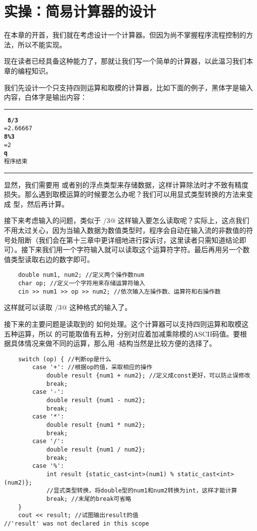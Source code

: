 \section{实操：简易计算器的设计}
在本章的开首，我们就在考虑设计一个计算器。但因为尚不掌握程序流程控制的方法，所以不能实现。\par
现在读者已经具备这种能力了，那就让我们写一个简单的计算器，以此温习我们本章的编程知识。\par
我们先设计一个只支持四则运算和取模的计算器，比如下面的例子，黑体字是输入内容，白体字是输出内容：\\\noindent\rule{\linewidth}{0.2pt}\texttt{
\textbf{8/3}\\
=2.66667\\
\textbf{8\%3}\\
=2\\
\textbf{q}\\
程序结束
}\\\noindent\rule{\linewidth}{0.2pt}\par
显然，我们需要用 \lstinline@double@ 或者别的浮点类型来存储数据，这样计算除法时才不致有精度损失。那么遇到取模运算的时候要怎么办呢？我们可以用显式类型转换的方法来变成 \lstinline@int@ 型，然后再计算。\par
接下来考虑输入的问题，类似于 /3@ 这样输入要怎么读取呢？实际上，这点我们不用太过关心，因为当输入数据为数值类型时，程序会自动在输入流的非数值的符号处阻断（我们会在第十三章中更详细地进行探诉讨，这里读者只需知道结论即可）。接下来我们用一个字符输入就可以读取这个运算符字符。最后再用另一个数值类型读取右边的数字即可。
\begin{lstlisting}
    double num1, num2; //定义两个操作数num
    char op; //定义一个字符用来存储运算符输入
    cin >> num1 >> op >> num2; //依次输入左操作数、运算符和右操作数
\end{lstlisting}
这样就可以读取 /3@ 这种格式的输入了。\par
接下来的主要问题是读取到的 \lstinline@op@ 如何处理。这个计算器可以支持四则运算和取模这五种运算，所以 \lstinline@op@ 的可能取值有五种，分别对应着加减乘除模的ASCII码值。要根据具体情况来做不同的运算，那么用 \lstinline@switch@-\lstinline@case@ 结构当然是比较方便的选择了。
\begin{lstlisting}
    switch (op) { //判断op是什么
        case '+': //根据op的值，采取相应的操作
            double result {num1 + num2}; //定义成const更好，可以防止误修改
            break;
        case '-':
            double result {num1 - num2};
            break;
        case '*':
            double result {num1 * num2};
            break;
        case '/':
            double result {num1 / num2};
            break;
        case '%':
            int result {static_cast<int>(num1) % static_cast<int>(num2)};
            //显式类型转换，将double型的num1和num2转换为int，这样才能计算
            break; //末尾的break可省略
    }
    cout << result; //试图输出result的值
//'result' was not declared in this scope
\end{lstlisting}
